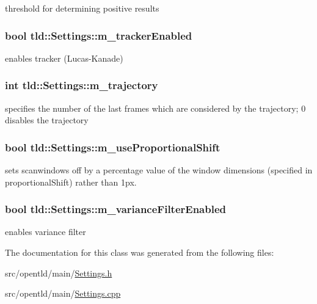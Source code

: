 threshold for determining positive results 

\hypertarget{classtld_1_1Settings_a54a14f7a08a919ee6ff19514205c6b47}{
\subsubsection[{m\-\_\-tracker\-Enabled}]{\setlength{\rightskip}{0pt plus 5cm}bool tld\-::\-Settings\-::m\-\_\-tracker\-Enabled}}\label{classtld_1_1Settings_a54a14f7a08a919ee6ff19514205c6b47}


enables tracker (Lucas-\/\-Kanade) 

\hypertarget{classtld_1_1Settings_a56281480120f9cb2dbf69022cf97a30a}{
\subsubsection[{m\-\_\-trajectory}]{\setlength{\rightskip}{0pt plus 5cm}int tld\-::\-Settings\-::m\-\_\-trajectory}}\label{classtld_1_1Settings_a56281480120f9cb2dbf69022cf97a30a}


specifies the number of the last frames which are considered by the trajectory; 0 disables the trajectory 

\hypertarget{classtld_1_1Settings_afd89a9d1a0a8dec5ce524eeed5b0f5e0}{
\subsubsection[{m\-\_\-use\-Proportional\-Shift}]{\setlength{\rightskip}{0pt plus 5cm}bool tld\-::\-Settings\-::m\-\_\-use\-Proportional\-Shift}}\label{classtld_1_1Settings_afd89a9d1a0a8dec5ce524eeed5b0f5e0}


sets scanwindows off by a percentage value of the window dimensions (specified in proportional\-Shift) rather than 1px. 

\hypertarget{classtld_1_1Settings_ab3100039fb52ee1a41813812320a6ca3}{
\subsubsection[{m\-\_\-variance\-Filter\-Enabled}]{\setlength{\rightskip}{0pt plus 5cm}bool tld\-::\-Settings\-::m\-\_\-variance\-Filter\-Enabled}}\label{classtld_1_1Settings_ab3100039fb52ee1a41813812320a6ca3}


enables variance filter 



The documentation for this class was generated from the following files\-:\begin{DoxyCompactItemize}
\item 
src/opentld/main/\hyperlink{Settings_8h}{Settings.\-h}\item 
src/opentld/main/\hyperlink{Settings_8cpp}{Settings.\-cpp}\end{DoxyCompactItemize}

